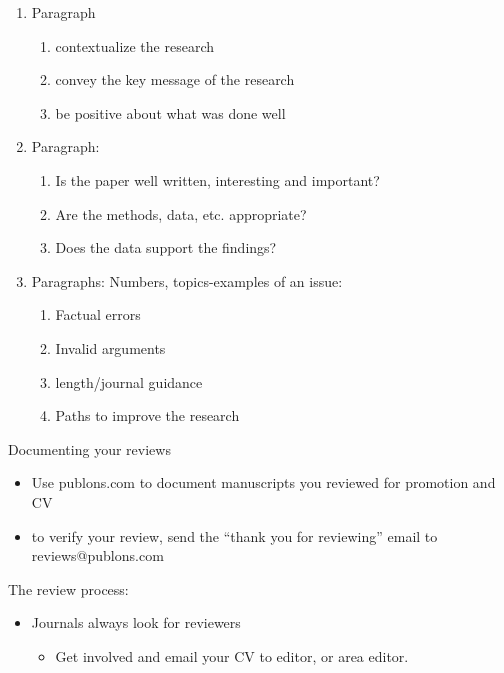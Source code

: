 \documentclass[
]{book}
\providecommand{\tightlist}{%
  \setlength{\itemsep}{0pt}\setlength{\parskip}{0pt}}
\begin{document}
\begin{enumerate}
\def\labelenumi{\arabic{enumi}.}
\item
  Paragraph

  \begin{enumerate}
  \def\labelenumii{\arabic{enumii}.}
  \item
    contextualize the research
  \item
    convey the key message of the research
  \item
    be positive about what was done well
  \end{enumerate}
\item
  Paragraph:

  \begin{enumerate}
  \def\labelenumii{\arabic{enumii}.}
  \item
    Is the paper well written, interesting and important?
  \item
    Are the methods, data, etc. appropriate?
  \item
    Does the data support the findings?
  \end{enumerate}
\item
  Paragraphs: Numbers, topics-examples of an issue:

  \begin{enumerate}
  \def\labelenumii{\arabic{enumii}.}
  \item
    Factual errors
  \item
    Invalid arguments
  \item
    length/journal guidance
  \item
    Paths to improve the research
  \end{enumerate}
\end{enumerate}

Documenting your reviews

\begin{itemize}
\item
  Use publons.com to document manuscripts you reviewed for promotion and CV
\item
  to verify your review, send the ``thank you for reviewing'' email to reviews@publons.com
\end{itemize}

The review process:

\begin{itemize}
\item
  Journals always look for reviewers

  \begin{itemize}
  \tightlist
  \item
    Get involved and email your CV to editor, or area editor.
  \end{itemize}
\end{itemize}
\end{document}

